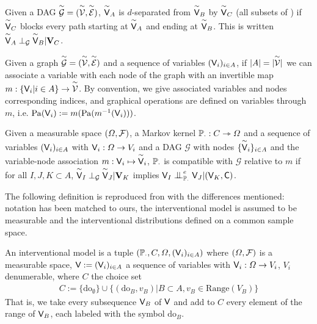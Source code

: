 \begin{definition}[d-separation]
Given a DAG $\overset{\sim}{\mathcal{G}}=(\overset{\sim}{\mathcal{V}},\overset{\sim}{\mathcal{E}})$, $\overset{\sim}{\mathsf{V}}_A$ is $d$-separated from $\overset{\sim}{\mathsf{V}}_B$ by $\overset{\sim}{\mathsf{V}}_C$ (all subsets of ) if $\overset{\sim}{\mathsf{V}}_C$ blocks every path starting at $\overset{\sim}{\mathsf{V}}_A$ and ending at $\overset{\sim}{\mathsf{V}}_B$. This is written $\overset{\sim}{\mathsf{V}}_A\perp_{\mathcal{G}} \overset{\sim}{\mathsf{V}}_B | \mathbf{V}_C$.
\end{definition}

\begin{definition}
Given a graph $\overset{\sim}{\mathcal{G}}=(\overset{\sim}{\mathcal{V}},\overset{\sim}{\mathcal{E}})$ and a sequence of variables $(\mathsf{V}_i)_{i\in A}$, if $|A|=|\overset{\sim}{\mathcal{V}}|$ we can associate a variable with each node of the graph with an invertible map $m:\{\mathsf{V}_i|i\in A\}\to \overset{\sim}{\mathcal{V}}$. By convention, we give associated variables and nodes corresponding indices, and graphical operations are defined on variables through $m$, i.e. $\mathrm{Pa}(\mathsf{V}_i):=m(\mathrm{Pa}(m^{-1}(\mathsf{V}_i)))$.
\end{definition}

\begin{definition}[Compatibility]\label{def:compat}
Given a measurable space $(\Omega,\mathcal{F})$, a Markov kernel $\mathbb{P}_\cdot:C\rightarrowtriangle \Omega$ and a sequence of variables $(\mathsf{V}_i)_{i\in A}$ with $\mathsf{V}_i:\Omega\to V_i$ and a DAG $\mathcal{G}$ with nodes $\{\overset{\sim}{\mathsf{V}}_i\}_{i\in A}$ and the variable-node association $m:\mathsf{V}_i\mapsto \overset{\sim}{\mathsf{V}}_i$, $\mathbb{P}_\cdot$ is compatible with $\mathcal{G}$ relative to $m$ if for all $I,J,K\subset A$, $\overset{\sim}{\mathsf{V}}_I\perp_{\mathcal{G}} \overset{\sim}{\mathsf{V}}_J | \mathbf{V}_K$ implies $\RV{V}_I\CI^e_{\prob{P}_\cdot} \RV{V}_J | (\RV{V}_K,\RV{C})$.
\end{definition}

The following definition is reproduced fron \citet{pearl_causality:_2009} with the differences mentioned: notation has been matched to ours, the interventional model is assumed to be measurable and the interventional distributions defined on a common sample space.

\begin{definition}\label{def:interventional}
An interventional model is a tuple $(\mathbb{P}_\cdot,C,\Omega,(\mathsf{V}_i)_{i\in A})$ where $(\Omega,\mathcal{F})$ is a measurable space,  $\mathsf{V}:=(\mathsf{V}_i)_{i\in A}$ a sequence of variables with $\mathsf{V}_i:\Omega\to V_i$, $V_i$ denumerable, where $C$ the choice set
\begin{align}
    C:=\{\mathrm{do}_{\emptyset}\}\cup \{(\mathrm{do}_B,v_B)|B\subset A,v_B\in \mathrm{Range}(V_B)\}
\end{align}
That is, we take every subsequence $\mathsf{V}_B$ of $\mathsf{V}$ and add to $C$ every element of the range of $\mathsf{V}_B$, each labeled with the symbol $\mathrm{do}_B$.
\end{definition}

